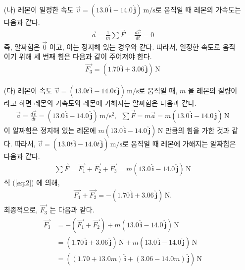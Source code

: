 \documentclass[floatfix,nofootinbib,superscriptaddress,fleqn,preprint]{revtex4}
\begin{document}
\begin{itemize}
  \item[(나)] 레몬이 일정한 속도 $\vec{v} =(13.0\,\hat{\bm{i}} -
  14.0\,\hat{\bm{j}})\,\mathrm{m/s}$로 움직일 때 레몬의
  가속도는 다음과 같다.
  \begin{align}
    \vec{a} = \frac{1}{m}\sum\vec{F}=\frac{d\vec{v}}{dt} = 0
  \end{align}
  즉, 알짜힘은 $\vec{0}$ 이고, 이는 정지해 있는 경우와 같다.
  따라서, 일정한 속도로 움직이기 위해 세 번째 힘은 
  다음과 같이 주어져야 한다.
  \begin{align}
    \vec{F_3}=(1.70\,\hat{\bm{i}} +
    3.06\,\hat{\bm{j}})\,\mathrm{N}
  \end{align}
  \item[(다)] 레몬이 속도 $\vec{v} =(13.0t\,\hat{\bm{i}} -
  14.0t\,\hat{\bm{j}})\,\mathrm{m/s}$로 움직일 때, $m$ 을 레몬의 
  질량이라고 하면 레몬의 가속도와 레몬에 가해지는 알짜힘은 다음과 같다.
  \begin{align}
    \vec{a} = \frac{d\vec{v}}{dt} = (13.0\,\hat{\bm{i}} -
    14.0\,\hat{\bm{j}})\,\mathrm{m/s^2},\,\,\,
    \sum\vec{F}=m\vec{a} =m(13.0\,\hat{\bm{i}} -
    14.0\,\hat{\bm{j}})\,\mathrm{N}
  \end{align}
  이 알짜힘은 정지해 있는 레몬에 $m(13.0\,\hat{\bm{i}} -
  14.0\,\hat{\bm{j}})\,\mathrm{N}$ 만큼의 힘을 가한 것과 같다. 
  따라서, $\vec{v} =(13.0t\,\hat{\bm{i}} -
  14.0t\,\hat{\bm{j}})\,\mathrm{m/s}$로 움직일 때 레몬에 가해지는 알짜힘은
  다음과 같다.
  \begin{align}
    \sum\vec{F} = \vec{F_1}+\vec{F_2}+\vec{F_3} 
    = m(13.0\,\hat{\bm{i}} - 14.0\,\hat{\bm{j}})\,\mathrm{N}
  \end{align}
  식 (\ref{eq:2}) 에 의해,
  \begin{align}
    \vec{F_1}+\vec{F_2} = -(1.70\,\hat{\bm{i}} +
    3.06\,\hat{\bm{j}})\,\mathrm{N}.
  \end{align}
  최종적으로, $\vec{F_3}$ 는 다음과 같다.
  \begin{align}
    \begin{split}
      \vec{F_3} &= -(\vec{F_1}+\vec{F_2})
      +m(13.0\,\hat{\bm{i}} -14.0\,\hat{\bm{j}})\,\mathrm{N}  \\
      &= (1.70\,\hat{\bm{i}} +3.06\,\hat{\bm{j}})\,\mathrm{N}
      +m(13.0\,\hat{\bm{i}} -14.0\,\hat{\bm{j}})\,\mathrm{N}  \\
      &=((1.70+13.0m)\,\hat{\bm{i}}+(3.06-14.0m)\,\hat{\bm{j}})\,\mathrm{N}
    \end{split}
  \end{align}
\end{itemize}
\vspace{2cm}
\end{document}
